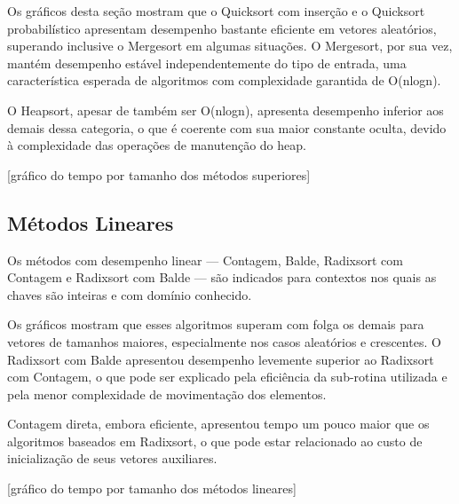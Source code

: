 Os gráficos desta seção mostram que o Quicksort com inserção e o Quicksort probabilístico apresentam desempenho bastante eficiente em vetores aleatórios, superando inclusive o Mergesort em algumas situações. O Mergesort, por sua vez, mantém desempenho estável independentemente do tipo de entrada, uma característica esperada de algoritmos com complexidade garantida de O(nlogn).

O Heapsort, apesar de também ser O(nlogn), apresenta desempenho inferior aos demais dessa categoria, o que é coerente com sua maior constante oculta, devido à complexidade das operações de manutenção do heap.

[gráfico do tempo por tamanho dos métodos superiores]

\subsection{Métodos Lineares}
Os métodos com desempenho linear — Contagem, Balde, Radixsort com Contagem e Radixsort com Balde — são indicados para contextos nos quais as chaves são inteiras e com domínio conhecido.

Os gráficos mostram que esses algoritmos superam com folga os demais para vetores de tamanhos maiores, especialmente nos casos aleatórios e crescentes. O Radixsort com Balde apresentou desempenho levemente superior ao Radixsort com Contagem, o que pode ser explicado pela eficiência da sub-rotina utilizada e pela menor complexidade de movimentação dos elementos.

Contagem direta, embora eficiente, apresentou tempo um pouco maior que os algoritmos baseados em Radixsort, o que pode estar relacionado ao custo de inicialização de seus vetores auxiliares.

[gráfico do tempo por tamanho dos métodos lineares]